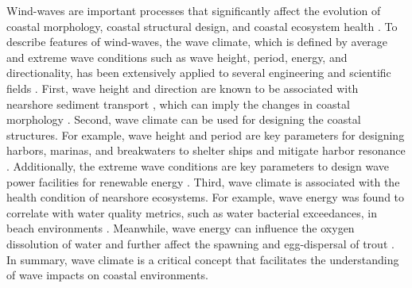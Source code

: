 Wind-waves are important processes that significantly affect the evolution of
coastal morphology, coastal structural design, and coastal ecosystem health
\citep{casas-prat_wind-wave_2024}. To describe features of wind-waves, the wave
climate, which is defined by average and extreme wave conditions such as wave
height, period, energy, and directionality, has been extensively applied to
several engineering and scientific fields
\citep{wiegel_oceanographical_1964,wiegel_oceanographical_2013}. First, wave
height and direction are known to be associated with nearshore sediment
transport \citep{pethick_introduction_1984,davila_promoting_2014}, which can
imply the changes in coastal morphology
\citep{lamoe_wave_1989,benumof_relationship_2000,brown_factors_2005}. Second,
wave climate can be used for designing the coastal structures. For example, wave
height and period are key parameters for designing harbors, marinas, and
breakwaters to shelter ships and mitigate harbor resonance
\citep{belvoir_problems_1981,usace_hydraulic_1984,rabinovich_seiches_2009}.
Additionally, the extreme wave conditions are key parameters to design wave
power facilities for renewable energy
\citep{guillou_wave_2020,neary_characterization_2020}. Third, wave climate is
associated with the health condition of nearshore ecosystems. For example, wave
energy was found to correlate with water quality metrics, such as water
bacterial exceedances, in beach environments \citep{feng_wave_2016}. Meanwhile,
wave energy can influence the oxygen dissolution of water and further affect the
spawning and egg-dispersal of trout
\citep{sly_interstitial_1988,fitzsimons_relationship_2014}. In summary, wave
climate is a critical concept that facilitates the understanding of wave impacts
on coastal environments.

